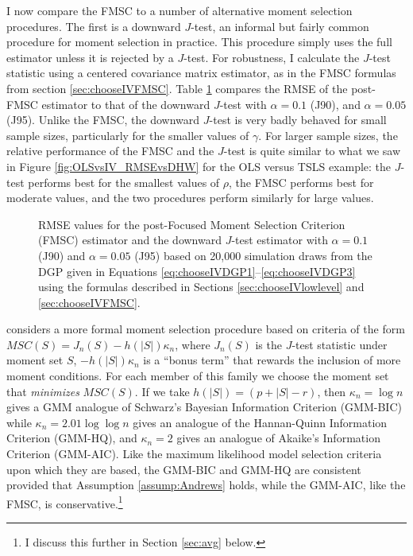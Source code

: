 I now compare the FMSC to a number of alternative moment selection procedures.
The first is a downward $J$-test, an informal but fairly common procedure for moment selection in practice.
This procedure simply uses the full estimator unless it is rejected by a $J$-test.
For robustness, I calculate the $J$-test statistic using a centered covariance matrix estimator, as in the FMSC formulas from section \ref{sec:chooseIVFMSC}.
Table \ref{fig:chooseIVsim_RMSErelJ} compares the RMSE of the post-FMSC estimator to that of the downward $J$-test with $\alpha = 0.1$ (J90), and $\alpha = 0.05$ (J95).
Unlike the FMSC, the downward $J$-test is very badly behaved for small sample sizes, particularly for the smaller values of $\gamma$.
For larger sample sizes, the relative performance of the FMSC and the $J$-test is quite similar to what we saw in Figure \ref{fig:OLSvsIV_RMSEvsDHW} for the OLS versus TSLS example: the $J$-test performs best for the smallest values of $\rho$, the FMSC performs best for moderate values, and the two procedures perform similarly for large values.
\begin{figure}
\centering
	
	\caption{RMSE values for the post-Focused Moment Selection Criterion (FMSC) estimator and the downward $J$-test estimator with $\alpha = 0.1$ (J90) and $\alpha = 0.05$ (J95) based on 20,000 simulation draws from the DGP given in Equations \ref{eq:chooseIVDGP1}--\ref{eq:chooseIVDGP3} using the formulas described in Sections \ref{sec:chooseIVlowlevel} and \ref{sec:chooseIVFMSC}.}
	\label{fig:chooseIVsim_RMSErelJ}
\end{figure}
\cite{Andrews1999} considers a more formal moment selection procedure based on criteria of the form $MSC(S) = J_n(S) - h(|S|)\kappa_n$, where $J_n(S)$ is the $J$-test statistic under moment set $S$, $-h(|S|)\kappa_n$ is a ``bonus term'' that rewards the inclusion of more moment conditions.
For each member of this family we choose the moment set that \emph{minimizes} $MSC(S)$. 
If we take $h(|S|) = (p + |S| - r)$, then $\kappa_n = \log{n}$ gives a GMM analogue of Schwarz's Bayesian Information Criterion (GMM-BIC) while $\kappa_n = 2.01 \log{\log{n}}$ gives an analogue of the Hannan-Quinn Information Criterion (GMM-HQ), and $\kappa_n = 2$ gives an analogue of Akaike's Information Criterion (GMM-AIC). 
Like the maximum likelihood model selection criteria upon which they are based, the GMM-BIC and GMM-HQ are consistent provided that Assumption \ref{assump:Andrews} holds, while the GMM-AIC, like the FMSC, is conservative.\footnote{I discuss this further in Section \ref{sec:avg} below.} 
